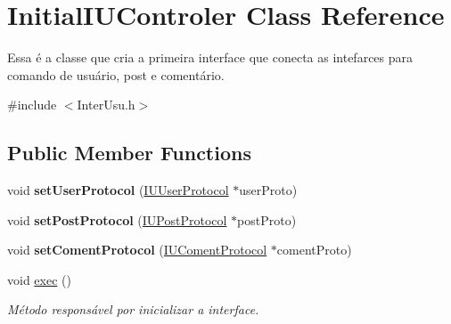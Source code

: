\hypertarget{class_initial_i_u_controler}{\section{Initial\-I\-U\-Controler Class Reference}
\label{class_initial_i_u_controler}
}


Essa é a classe que cria a primeira interface que conecta as intefarces para comando de usuário, post e comentário.  




{\ttfamily \#include $<$Inter\-Usu.\-h$>$}

\subsection*{Public Member Functions}
\begin{DoxyCompactItemize}
\item 
\hypertarget{class_initial_i_u_controler_a23ae82f08f995970fd8948ecd3ec5a57}{void {\bfseries set\-User\-Protocol} (\hyperlink{class_i_u_user_protocol}{I\-U\-User\-Protocol} $\ast$user\-Proto)}\label{class_initial_i_u_controler_a23ae82f08f995970fd8948ecd3ec5a57}

\item 
\hypertarget{class_initial_i_u_controler_ae296b428fcd6ff09520eac5c8bed9538}{void {\bfseries set\-Post\-Protocol} (\hyperlink{class_i_u_post_protocol}{I\-U\-Post\-Protocol} $\ast$post\-Proto)}\label{class_initial_i_u_controler_ae296b428fcd6ff09520eac5c8bed9538}

\item 
\hypertarget{class_initial_i_u_controler_a3fa667657f80bf466d503410759e393d}{void {\bfseries set\-Coment\-Protocol} (\hyperlink{class_i_u_coment_protocol}{I\-U\-Coment\-Protocol} $\ast$coment\-Proto)}\label{class_initial_i_u_controler_a3fa667657f80bf466d503410759e393d}

\item 
\hypertarget{class_initial_i_u_controler_a5eb5360ca1231f14599ea26c29c43588}{void \hyperlink{class_initial_i_u_controler_a5eb5360ca1231f14599ea26c29c43588}{exec} ()}\label{class_initial_i_u_controler_a5eb5360ca1231f14599ea26c29c43588}

\begin{DoxyCompactList}\small\item\em Método responsável por inicializar a interface. \end{DoxyCompactList}\end{DoxyCompactItemize}


